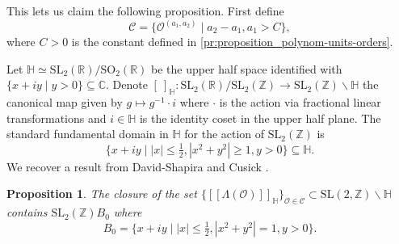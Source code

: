 \documentclass[11pt,letterpaper]{amsart}
\newtheorem{prop}[theorem]{Proposition}
\theoremstyle{definition}
\theoremstyle{remark}
\renewcommand{\rm}[1]{\mathrm{#1}}
\newcommand{\cal}[1]{\mathcal{#1}}
\newcommand{\bb}[1]{\mathbb{#1}}
\newcommand{\Z}{\bb Z}
\newcommand{\calC}{\cal C}
\newcommand{\calO}{\cal O}
\newcommand{\SL}{\rm{SL}}
\newcommand{\SO}{\rm{SO}}
\begin{document}
	This lets us claim the following proposition.
	First define
	\begin{equation}
		\mathcal{C} = \{ \calO^{(a_1,a_2)} \mid a_2 -a_1,a_1 > C\},
	\end{equation}
	where $C>0$ is the constant defined in \cref{pr:proposition_polynom-units-orders}.
	
	Let $\mathbb{H} \simeq \SL_{2}(\mathbb{R})/\SO_2(\mathbb{R})$ be the upper half space identified with $\{x + i y \mid y>0\} \subseteq \mathbb{C}$.
	Denote $[\ ]_{\mathbb{H}}  : \SL_{2}(\mathbb{R})/\SL_{2}(\mathbb{Z}) \rightarrow \SL_{2}(\mathbb{Z})\backslash \mathbb{H}$ the canonical map given by $g \mapsto g^{-1} \cdot i$ where $\cdot $ is the action via fractional linear transformations and $i \in \mathbb{H}$ is the identity coset in the upper half plane. The standard fundamental domain in $\mathbb{H}$ for the action of $\SL_2(\mathbb{Z})$ is
	\begin{equation}
		\Big\lbrace x + i y \; \Big\vert \; |x| \leq \tfrac{1}{2} , |x^{2} + y^{2}| \geq 1, y>0 \Big\rbrace \subseteq \mathbb{H}.
	\end{equation}
	We recover a result from David-Shapira \cite{davidShapesUnitLattices2017} and Cusick \cite{cusickRegulatorSpectrumTotally1991}.
	\begin{prop}\label{prop-bounded-shape}
		The closure of the set
		$ \lbrace [[\Lambda(\calO)]]_{\mathbb{H}} \rbrace_{\calO \in \calC} \subset \SL(2,\Z) \backslash \mathbb{H}$ contains 
		$\SL_{2}(\mathbb{Z}) B_{0}$ where 
		\begin{equation}
			B_{0} = \Big\lbrace x + i y \; \Big\vert \; |x| \leq \tfrac{1}{2} , |x^{2} + y^{2}| = 1, y>0 \Big\rbrace.
		\end{equation}
	\end{prop}
\end{document}
